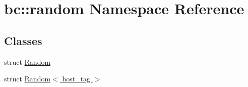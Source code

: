 \hypertarget{namespacebc_1_1random}{}\section{bc\+:\+:random Namespace Reference}
\label{namespacebc_1_1random}
\subsection*{Classes}
\begin{DoxyCompactItemize}
\item 
struct \hyperlink{structbc_1_1random_1_1Random}{Random}
\item 
struct \hyperlink{structbc_1_1random_1_1Random_3_01host__tag_01_4}{Random$<$ host\+\_\+tag $>$}
\end{DoxyCompactItemize}
